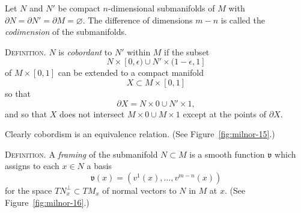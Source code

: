 Let $N$ and $N'$ be compact $n$-dimensional submanifolds of $M$ with $\partial N = \partial N' = \partial M = \varnothing$. The difference of dimensions $m - n$ is called the \emph{codimension} of the submanifolds.

\textsc{Definition.} $N$ is \emph{cobordant} to $N'$ within $M$ if the subset
\[
N \times [0, \epsilon) \cup N' \times (1 - \epsilon, 1]
\]
of $M \times [0, 1]$ can be extended to a compact manifold
\[
X \subset M \times [0, 1]
\]
so that
\[
\partial X = N \times 0 \cup N' \times 1,
\]
and so that $X$ does not intersect $M \times 0 \cup M \times 1$ except at the points of $\partial X$.

Clearly cobordism is an equivalence relation. (See Figure~\ref{fig:milnor-15}.)

\textsc{Definition.} A \emph{framing} of the submanifold $N \subset M$ is a smooth function $\mathfrak{v}$ which assigns to each $x \in N$ a basis
\[
\mathfrak{v}(x) = (v^1(x), \ldots, v^{m-n}(x))
\]
for the space $TN_x^\perp \subset TM_x$ of normal vectors to $N$ in $M$ at $x$. (See Figure~\ref{fig:milnor-16}.)

